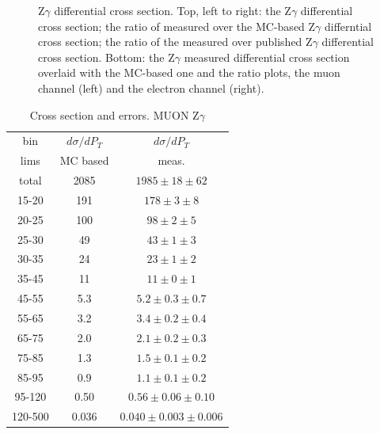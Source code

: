 \begin{figure}[htb]
\begin{center}
  \caption{Z$\gamma$ differential cross section. Top, left to right: the Z$\gamma$ differential cross section; the ratio of measured over the MC-based Z$\gamma$ differntial cross section; the ratio of the measured over published Z$\gamma$ differential cross section. Bottom:  the Z$\gamma$ measured differential cross section overlaid with the MC-based one and the ratio plots, the muon channel (left) and the electron channel (right).}
  \label{fig:CS_Zg}
 \end{center}
\end{figure}
  

\begin{table}[h]
  \scriptsize
  \begin{center}
  \caption{Cross section and errors. MUON Z$\gamma$}
  \begin{tabular}{|c|c|c|}
    bin & $d\sigma/dP_{T}$ &$d\sigma/dP_{T}$ \\ 
    lims & MC based &    meas.       \\ \hline
    total & 2085 & $1985 \pm 18 \pm 62$ \\ \hline
    15-20 & 191 & $178 \pm 3 \pm 8$ \\ \hline
    20-25 & 100 & $98 \pm 2 \pm 5$ \\ \hline
    25-30 & 49 & $43 \pm 1 \pm 3$ \\ \hline
    30-35 & 24 & $23 \pm 1 \pm 2$ \\ \hline
    35-45 & 11 & $11 \pm 0 \pm 1$ \\ \hline
    45-55 & 5.3 & $5.2 \pm 0.3 \pm 0.7$ \\ \hline
    55-65 & 3.2 & $3.4 \pm 0.2 \pm 0.4$ \\ \hline
    65-75 & 2.0 & $2.1 \pm 0.2 \pm 0.3$ \\ \hline
    75-85 & 1.3 & $1.5 \pm 0.1 \pm 0.2$ \\ \hline
    85-95 & 0.9 & $1.1 \pm 0.1 \pm 0.2$ \\ \hline
    95-120 & 0.50 & $0.56 \pm 0.06 \pm 0.10$ \\ \hline
    120-500 & 0.036 & $0.040 \pm 0.003 \pm 0.006$ \\ \hline
  \end{tabular}
  \label{tab:sc_mc_vs_meas_MUON_ZGamma}
  \end{center}
\end{table}

